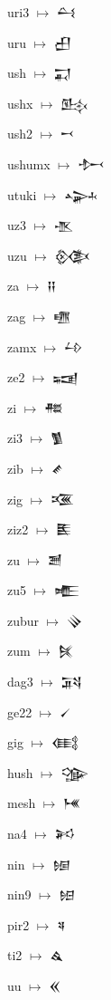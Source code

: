 {\noindent uri3 $\mapsto$ {\cufont 𒌶}\par
\noindent uru $\mapsto$ {\cufont 𒌷}\par
\noindent ush $\mapsto$ {\cufont 𒍑}\par
\noindent ushx $\mapsto$ {\cufont 𒍖}\par
\noindent ush2 $\mapsto$ {\cufont 𒍗}\par
\noindent ushumx $\mapsto$ {\cufont 𒍘}\par
\noindent utuki $\mapsto$ {\cufont 𒍙}\par
\noindent uz3 $\mapsto$ {\cufont 𒍚}\par
\noindent uzu $\mapsto$ {\cufont 𒍜}\par
\noindent za $\mapsto$ {\cufont 𒍝}\par
\noindent zag $\mapsto$ {\cufont 𒍠}\par
\noindent zamx $\mapsto$ {\cufont 𒍡}\par
\noindent ze2 $\mapsto$ {\cufont 𒍢}\par
\noindent zi $\mapsto$ {\cufont 𒍣}\par
\noindent zi3 $\mapsto$ {\cufont 𒍥}\par
\noindent zib $\mapsto$ {\cufont 𒍦}\par
\noindent zig $\mapsto$ {\cufont 𒍨}\par
\noindent ziz2 $\mapsto$ {\cufont 𒍩}\par
\noindent zu $\mapsto$ {\cufont 𒍪}\par
\noindent zu5 $\mapsto$ {\cufont 𒍫}\par
\noindent zubur $\mapsto$ {\cufont 𒍭}\par
\noindent zum $\mapsto$ {\cufont 𒍮}\par
\noindent dag3 $\mapsto$ {\cufont 𒍴}\par
\noindent ge22 $\mapsto$ {\cufont 𒍻}\par
\noindent gig $\mapsto$ {\cufont 𒍼}\par
\noindent hush $\mapsto$ {\cufont 𒍽}\par
\noindent mesh $\mapsto$ {\cufont 𒎌}\par
\noindent na4 $\mapsto$ {\cufont 𒎎}\par
\noindent nin $\mapsto$ {\cufont 𒎏}\par
\noindent nin9 $\mapsto$ {\cufont 𒎐}\par
\noindent pir2 $\mapsto$ {\cufont 𒎕}\par
\noindent ti2 $\mapsto$ {\cufont 𒎗}\par
\noindent uu $\mapsto$ {\cufont 𒎙}\par
}
